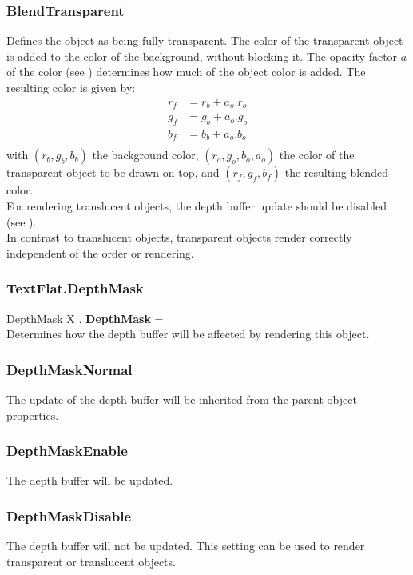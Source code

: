 \subsubsection{BlendTransparent \label{T:BlendType|BlendTransparent}}
Defines the object as being fully transparent. The color of the transparent object is added to the color of the background, without blocking it. The opacity factor $a$ of the color (see ) determines how much of the object color is added. The resulting color is given by:
\begin{equation}
\begin{array}{rcl}
r_f & = r_b + a_o . r_o \\
g_f & = g_b + a_o . g_o \\
b_f & = b_b + a_o . b_o \\
\end{array}
\end{equation}
with $(r_b,g_b,b_b)$ the background color, $(r_o,g_o,b_o,a_o)$ the color of the transparent object to be drawn on top, and $(r_f,g_f,b_f)$ the resulting blended color. \\
For rendering translucent objects, the depth buffer update should be disabled (see ). \\
In contrast to translucent objects, transparent objects render correctly independent of the order or rendering.

\subsubsection{TextFlat.DepthMask \label{F:TextFlat:DepthMask}}
DepthMask X . \textbf{DepthMask} = \\
Determines how the depth buffer will be affected by rendering this object.

\subsubsection{DepthMaskNormal \label{T:DepthMask|DepthMaskNormal}}
The update of the depth buffer will be inherited from the parent object properties.

\subsubsection{DepthMaskEnable \label{T:DepthMask|DepthMaskEnable}}
The depth buffer will be updated.

\subsubsection{DepthMaskDisable \label{T:DepthMask|DepthMaskDisable}}
The depth buffer will not be updated. This setting can be used to render transparent or translucent objects.

